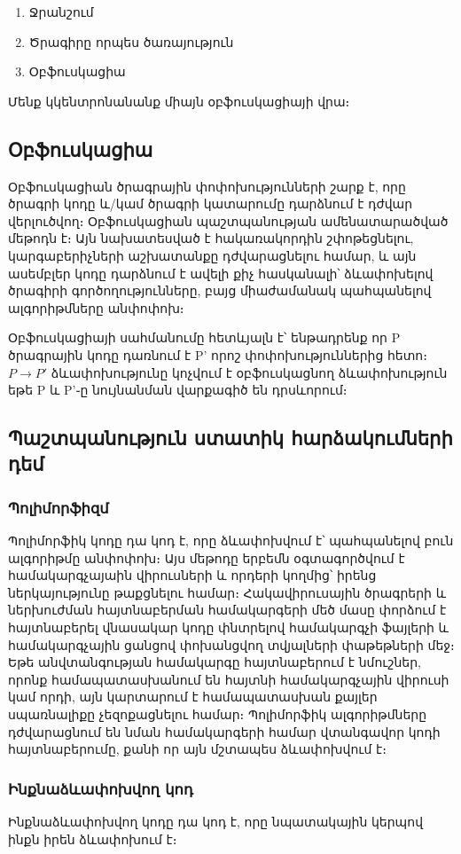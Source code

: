 \documentclass[12pt]{article}
\begin{document}
\begin{sloppypar}
\begin{enumerate}
\item Ջրանշում
\item Ծրագիրը որպես ծառայություն
\item Օբֆուսկացիա
\end{enumerate}

Մենք կկենտրոնանանք միայն օբֆուսկացիայի վրա։

\subsection{Օբֆուսկացիա}
Օբֆուսկացիան ծրագրային փոփոխությունների շարք է, որը ծրագրի կոդը և/կամ
ծրագրի կատարումը դարձնում է դժվար վերլուծվող։ Օբֆուսկացիան պաշտպանության
ամենատարածված մեթոդն է։ Այն նախատեսված է հակառակորդին շփոթեցնելու,
կարգաբերիչների աշխատանքը դժվարացնելու համար, և այն ասեմբլեր կոդը դարձնում է
ավելի քիչ հասկանալի՝ ձևափոխելով ծրագիրի գործողությունները, բայց միաժամանակ
պահպանելով ալգորիթմները անփոփոխ։

Օբֆուսկացիայի սահմանումը հետևյալն է՝ ենթադրենք որ P ծրագրային կոդը դառնում է
P' որոշ փոփոխություններից հետո։ $P \rightarrow P'$ ձևափոխությունը կոչվում է
օբֆուսկացնող ձևափոխություն եթե P և P'֊ը նույնանման վարքագիծ են դրսևորում։

\subsection{Պաշտպանություն ստատիկ հարձակումների դեմ}
\subsubsection{Պոլիմորֆիզմ}
	Պոլիմորֆիկ կոդը դա կոդ է, որը ձևափոխվում է՝ պահպանելով բուն ալգորիթմը
	անփոփոխ։ Այս մեթոդը երբեմն օգտագործվում է համակարգչայաին վիրուսների
	և որդերի կողմից՝ իրենց ներկայությունը թաքցնելու
	համար։ Հակավիրուսային ծրագրերի և ներխուժման հայտնաբերման համակարգերի
	մեծ մասը փորձում է հայտնաբերել վնասակար կոդը փնտրելով համակարգչի ֆայլերի և
	համակարգչային ցանցով փոխանցվող տվյալների փաթեթների մեջ։ Եթե անվտանգության
	համակարգը հայտնաբերում է նմուշներ, որոնք համապատասխանում են հայտնի
	համակարգչային վիրուսի կամ որդի, այն կարտարում է համապատասխան քայլեր
	սպառնալիքը չեզոքացնելու համար։ Պոլիմորֆիկ ալգորիթմները դժվարացնում են
	նման համակարգերի համար վտանգավոր կոդի հայտնաբերումը, քանի որ այն
	մշտապես ձևափոխվում է։

\subsubsection{Ինքնաձևափոխվող կոդ}
	Ինքնաձևափոխվող կոդը դա կոդ է, որը նպատակային կերպով ինքն իրեն ձևափոխում է։


\end{sloppypar}
\end{document}
